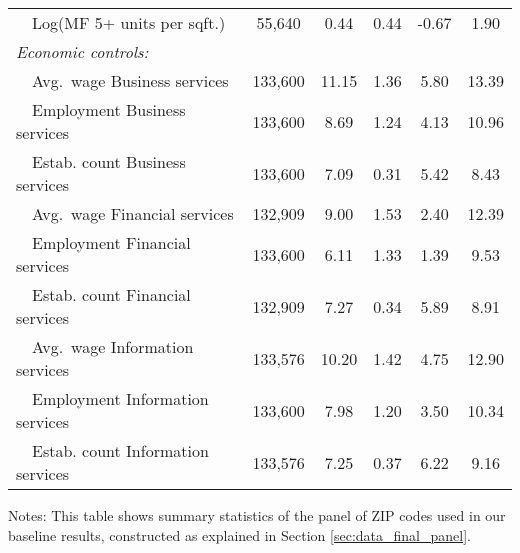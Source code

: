 \begin{table}[hbt!]
\begin{tabular}{@{}lccccc@{}}
        $\quad$Log(MF 5+ units per sqft.)             & 55,640  & 0.44  & 0.44  & -0.67  & 1.90  \\[.3em]
        \textit{Economic controls:}                   &       &       &       &       &       \\
        $\quad$Avg.\ wage Business services           & 133,600  & 11.15  & 1.36  & 5.80  & 13.39  \\
        $\quad$Employment Business services           & 133,600  & 8.69  & 1.24  & 4.13  & 10.96  \\
        $\quad$Estab. count Business services         & 133,600  & 7.09  & 0.31  & 5.42  & 8.43  \\
        $\quad$Avg.\ wage Financial services          & 132,909  & 9.00  & 1.53  & 2.40  & 12.39  \\
        $\quad$Employment Financial services          & 133,600  & 6.11  & 1.33  & 1.39  & 9.53  \\
        $\quad$Estab. count Financial services        & 132,909  & 7.27  & 0.34  & 5.89  & 8.91  \\
        $\quad$Avg.\ wage Information services        & 133,576  & 10.20  & 1.42  & 4.75  & 12.90  \\
        $\quad$Employment Information services        & 133,600  & 7.98  & 1.20  & 3.50  & 10.34  \\
        $\quad$Estab. count Information services      & 133,576  & 7.25  & 0.37  & 6.22  & 9.16  \\ \bottomrule
    \end{tabular}

    \begin{minipage}{.95\textwidth} \footnotesize
        \vspace{2mm}
        Notes: This table shows summary statistics of the panel of ZIP codes 
        used in our baseline results, constructed as explained in Section 
        \ref{sec:data_final_panel}.
    \end{minipage}
\end{table}
